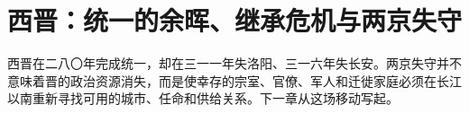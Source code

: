 \chapter{西晋：统一的余晖、继承危机与两京失守}
\label{ch:western-jin}







\begin{turningpoint}[从洛阳到建业]
西晋在二八〇年完成统一，却在三一一年失洛阳、三一六年失长安。两京失守并不意味着晋的政治资源消失，而是使幸存的宗室、官僚、军人和迁徙家庭必须在长江以南重新寻找可用的城市、任命和供给关系。下一章从这场移动写起。
\end{turningpoint}
